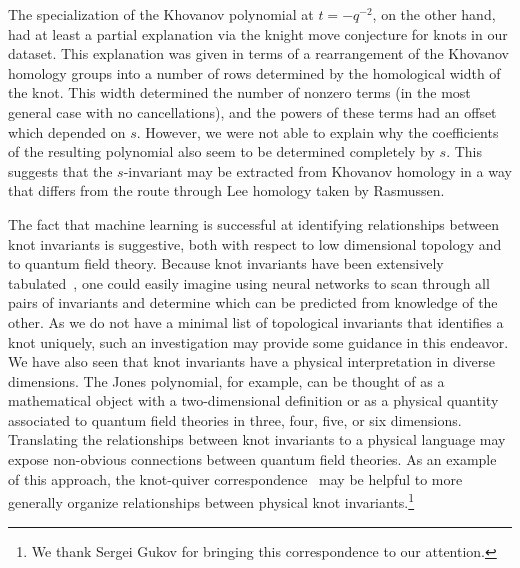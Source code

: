\documentclass[11pt]{article}
\numberwithin{equation}{section}
\begin{document}
The specialization of the Khovanov polynomial at $t = -q^{-2}$, on the other hand, had at least a partial explanation via the knight move conjecture for knots in our dataset.
This explanation was given in terms of a rearrangement of the Khovanov homology groups into a number of rows determined by the homological width of the knot.
This width determined the number of nonzero terms (in the most general case with no cancellations), and the powers of these terms had an offset which depended on $s$.
However, we were not able to explain why the coefficients of the resulting polynomial also seem to be determined completely by $s$.
This suggests that the $s$-invariant may be extracted from Khovanov homology in a way that differs from the route through Lee homology taken by Rasmussen.

The fact that machine learning is successful at identifying relationships between knot invariants is suggestive, both with respect to low dimensional topology and to quantum field theory.
Because knot invariants have been extensively tabulated~\cite{KnotAtlas, knotinfo}, one could easily imagine using neural networks to scan through all pairs of invariants and determine which can be predicted from knowledge of the other.
As we do not have a minimal list of topological invariants that identifies a knot uniquely, such an investigation may provide some guidance in this endeavor.
We have also seen that knot invariants have a physical interpretation in diverse dimensions.
The Jones polynomial, for example, can be thought of as a mathematical object with a two-dimensional definition or as a physical quantity associated to quantum field theories in three, four, five, or six dimensions.
Translating the relationships between knot invariants to a physical language may expose non-obvious connections between quantum field theories.
As an example of this approach, the knot-quiver correspondence~\cite{Kucharski:2017ogk} may be helpful to more generally organize relationships between physical knot invariants.\footnote{We thank Sergei Gukov for bringing this correspondence to our attention.}
\end{document}
